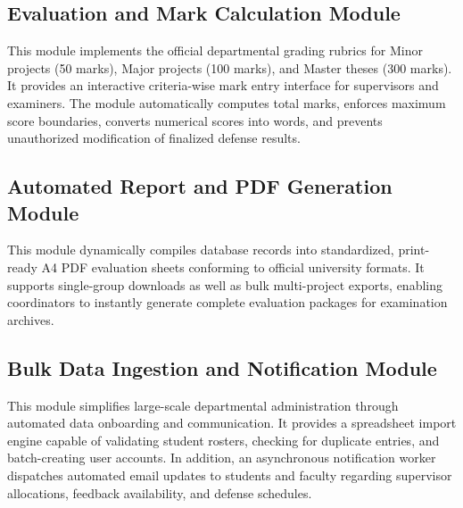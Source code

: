 \documentclass[12pt,a4paper]{report}
\begin{document}
\subsection{Evaluation and Mark Calculation Module}
This module implements the official departmental grading rubrics for Minor projects (50 marks), Major projects (100 marks), and Master theses (300 marks). It provides an interactive criteria-wise mark entry interface for supervisors and examiners. The module automatically computes total marks, enforces maximum score boundaries, converts numerical scores into words, and prevents unauthorized modification of finalized defense results.

\subsection{Automated Report and PDF Generation Module}
This module dynamically compiles database records into standardized, print-ready A4 PDF evaluation sheets conforming to official university formats. It supports single-group downloads as well as bulk multi-project exports, enabling coordinators to instantly generate complete evaluation packages for examination archives.

\subsection{Bulk Data Ingestion and Notification Module}
This module simplifies large-scale departmental administration through automated data onboarding and communication. It provides a spreadsheet import engine capable of validating student rosters, checking for duplicate entries, and batch-creating user accounts. In addition, an asynchronous notification worker dispatches automated email updates to students and faculty regarding supervisor allocations, feedback availability, and defense schedules.
\end{document}
